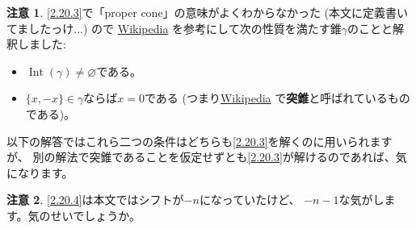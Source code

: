 \documentclass[uplatex,dvipdfmx]{jsarticle}
\theoremstyle{definition}
\newtheorem*{rem*}{注意}
\DeclareMathOperator{\Int}{\mathrm{Int}}
\renewcommand{\emptyset}{\varnothing}
\begin{document}
\begin{rem*}
  \ref{2.20.3}で「proper cone」の意味がよくわからなかった
  (本文に定義書いてましたっけ...) ので
  \href{https://ja.wikipedia.org/wiki/%E5%87%B8%E9%8C%90}{Wikipedia}
  を参考にして次の性質を満たす錐\(\gamma\)のことと解釈しました:
  \begin{itemize}
    \item \(\Int(\gamma) \neq \emptyset\)である。
    \item \(\{x,-x\}\in \gamma\)ならば\(x=0\)である
    (つまり\href{https://ja.wikipedia.org/wiki/%E5%87%B8%E9%8C%90}{Wikipedia}
    で\textbf{突錐}と呼ばれているものである)。
  \end{itemize}
  以下の解答ではこれら二つの条件はどちらも\ref{2.20.3}を解くのに用いられますが、
  別の解法で突錐であることを仮定せずとも\ref{2.20.3}が解けるのであれば、気になります。
\end{rem*}

\begin{rem*}
  \ref{2.20.4}は本文ではシフトが\(-n\)になっていたけど、
  \(-n-1\)な気がします。気のせいでしょうか。
\end{rem*}
\end{document}
